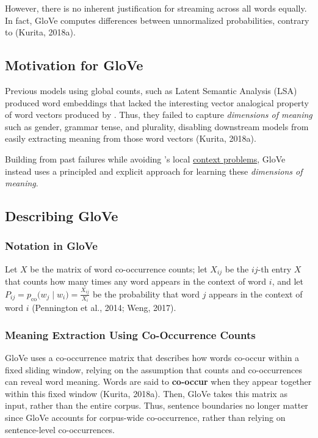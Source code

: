 However, there is no inherent justification for streaming across all words equally. In fact, GloVe computes differences between unnormalized probabilities, contrary to  (Kurita, 2018a). 


\subsection{Motivation for GloVe} \label{sec:MotivationGlove}

Previous models using global counts, such as Latent Semantic Analysis (LSA) produced word embeddings that lacked the interesting vector analogical property of word vectors produced by . Thus, they failed to capture \emph{dimensions of meaning} such as gender, grammar tense, and plurality, disabling downstream models from easily extracting meaning from those word vectors (Kurita, 2018a). \newline

Building from past failures while avoiding 's local \hyperref[sec:ProblemWord2VecFromGloveStandpoint]{context problems}, GloVe instead uses a principled and explicit approach for learning these \emph{dimensions of meaning}.


\subsection{Describing GloVe} \label{sec:DefGlove}

\subsubsection{Notation in GloVe}

Let $X$ be the matrix of word co-occurrence counts; let $X_{ij}$ be the $ij$-th entry $X$ that counts how many times any word appears in the context of word $i$, and let $P_{ij} = p_{\text{co}} \Big(w_j \; | \; w_i \Big) = \frac {X_{ij}} {X_i}$ be the probability that word $j$ appears in the context of word $i$ (Pennington et al., 2014; Weng, 2017).

\subsubsection{Meaning Extraction Using Co-Occurrence Counts}

GloVe uses a co-occurrence matrix that describes how words co-occur within a fixed sliding window, relying on the assumption that counts and co-occurrences can reveal word meaning. Words are said to \textbf{co-occur} when they appear together within this fixed window (Kurita, 2018a). Then, GloVe takes this matrix as input, rather than the entire corpus. Thus, sentence boundaries no longer matter since GloVe accounts for corpus-wide co-occurrence, rather than relying on sentence-level co-occurrences. \newline

